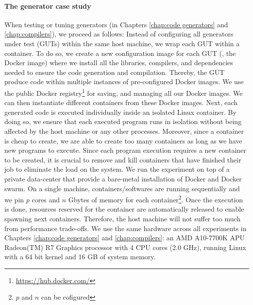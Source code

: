 \paragraph{The generator case study}
When testing or tuning generators (in Chapters \ref{chap:code generators} and \ref{chap:compilers}), we proceed as follows:
Instead of configuring all generators under test (GUTs) within the same host machine, we wrap each GUT within a container. To do so, we create a new configuration image for each GUT (\ie, the Docker image) where we install all the libraries, compilers, and dependencies needed to ensure the code generation and compilation. Thereby, the GUT produce code within multiple instances of pre-configured Docker images.
We use the public Docker registry\footnote{\url{https://hub.docker.com/}} for  saving, and managing all our Docker images. 
We can then instantiate different containers from these Docker images. 
Next, each generated code is executed individually inside an isolated Linux container. By doing so, we ensure that each executed program runs in isolation without being affected by the host machine or any other processes. Moreover, since a container is cheap to create, we are able to create too many containers as long as we have new programs to execute.  
Since each program execution requires a new container to be created, it is crucial to remove and kill containers that have finished their job to eliminate the load on the system. We run the experiment on top of a private data-center that provide a bare-metal installation of Docker and Docker swarm. On a single machine,  containers/softwares are running sequentially and we pin $p$ cores and $n$ Gbytes of memory for each container\footnote{$p$ and $n$ can be cofigured}. Once the execution is done, resources reserved for the container are automatically released to enable spawning next containers. Therefore, the host machine will not suffer too much from performance trade-offs.
We use the same hardware across all experiments in Chapters \ref{chap:code generators} and \ref{chap:compilers}: an AMD A10-7700K APU Radeon(TM) R7 Graphics processor with 4 CPU cores (2.0 GHz), running Linux with a 64 bit kernel and 16 GB of system memory.

